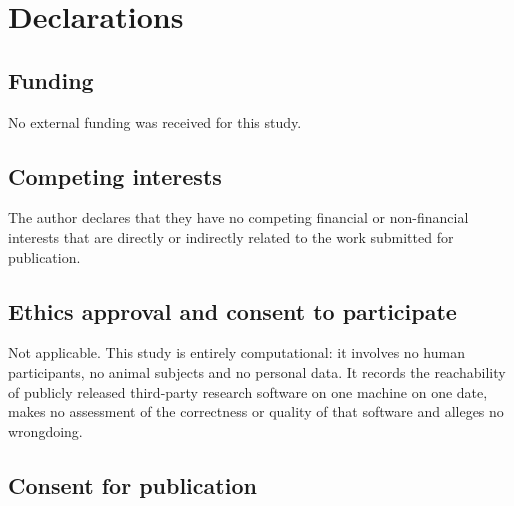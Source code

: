 \begin{table}[htbp]
\centering
\caption{Every artifact this manuscript rests on, with its size and the first 16
hexadecimal characters of its SHA-256 checksum. Full checksums, and the paths they
apply to, are in the manifest accompanying the manuscript source; the prefix is
shown here only because a 64-character checksum does not set in a table column.
The figure and table code recomputes each checksum from the bytes on disk before
reading them and stops the build on any mismatch.}
\label{tab:evidence}
\footnotesize

\end{table}

\section*{Declarations}

\subsection*{Funding}

No external funding was received for this study.

\subsection*{Competing interests}

The author declares that they have no competing financial or non-financial
interests that are directly or indirectly related to the work submitted for
publication.

\subsection*{Ethics approval and consent to participate}

Not applicable. This study is entirely computational: it involves no human
participants, no animal subjects and no personal data. It records the
reachability of publicly released third-party research software on one machine
on one date, makes no assessment of the correctness or quality of that software
and alleges no wrongdoing.

\subsection*{Consent for publication}


